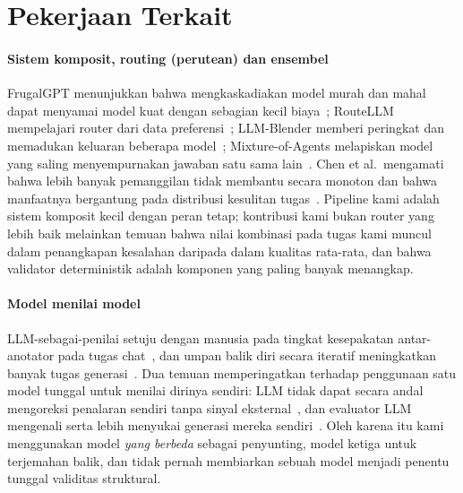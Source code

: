 \section{Pekerjaan Terkait}
\label{sec:related}

\paragraph{Sistem komposit, routing (perutean) dan ensembel}
FrugalGPT menunjukkan bahwa mengkaskadiakan model murah dan mahal dapat menyamai model kuat dengan sebagian kecil biaya~\cite{chen2023frugalgpt}; RouteLLM mempelajari router dari data preferensi~\cite{ong2024routellm}; LLM-Blender memberi peringkat dan memadukan keluaran beberapa model~\cite{jiang2023blender}; Mixture-of-Agents melapiskan model yang saling menyempurnakan jawaban satu sama lain~\cite{wang2024moa}. Chen et al.\  mengamati bahwa lebih banyak pemanggilan tidak membantu secara monoton dan bahwa manfaatnya bergantung pada distribusi kesulitan tugas~\cite{chen2024compound}. Pipeline kami adalah sistem komposit kecil dengan peran tetap; kontribusi kami bukan router yang lebih baik melainkan temuan bahwa nilai kombinasi pada tugas kami muncul dalam penangkapan kesalahan daripada dalam kualitas rata-rata, dan bahwa validator deterministik adalah komponen yang paling banyak menangkap.

\paragraph{Model menilai model}
LLM-sebagai-penilai setuju dengan manusia pada tingkat kesepakatan antar-anotator pada tugas chat~\cite{zheng2023judge}, dan umpan balik diri secara iteratif meningkatkan banyak tugas generasi~\cite{madaan2023selfrefine,shinn2023reflexion}. Dua temuan memperingatkan terhadap penggunaan satu model tunggal untuk menilai dirinya sendiri: LLM tidak dapat secara andal mengoreksi penalaran sendiri tanpa sinyal eksternal~\cite{huang2024selfcorrect}, dan evaluator LLM mengenali serta lebih menyukai generasi mereka sendiri~\cite{panickssery2024selfpref}. Oleh karena itu kami menggunakan model \emph{yang berbeda} sebagai penyunting, model ketiga untuk terjemahan balik, dan tidak pernah membiarkan sebuah model menjadi penentu tunggal validitas struktural.

